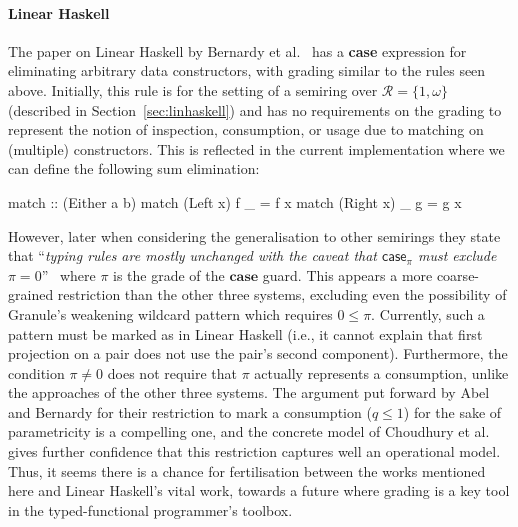  \paragraph{Linear Haskell}
 The paper on Linear Haskell by Bernardy et
 al.~\cite{linear-haskell} has a \textbf{case} expression for
 eliminating arbitrary data constructors, with grading similar
 to the rules seen above. Initially, this rule is for the setting
 of a semiring over $\mathcal{R} = \{1, \omega\}$ (described
 in Section~\ref{sec:linhaskell}) and has no requirements on the grading
 to represent the notion of inspection, consumption, or usage due to
 matching on (multiple) constructors.
 This is reflected in the current
 implementation where we can define the following sum elimination:
 \begin{haskell}
 match :: (Either a b) %
 match (Left x) f _  = f x
 match (Right x) _ g = g x
 \end{haskell}
 However, later when considering
 the generalisation to other semirings they state that
 ``\emph{typing rules are mostly unchanged with the caveat that
 $\mathsf{case}_\pi$ must exclude $\pi = 0$}''~\cite[\S{}7.2,
 p.25]{linear-haskell} where $\pi$ is the grade of the $\textbf{case}$ guard.
 This appears a more coarse-grained restriction
 than the other three systems, excluding even the possibility of
 Granule's weakening wildcard pattern which requires $0 \leq \pi$.
 Currently, such a pattern must be marked as  in Linear
 Haskell (i.e., it cannot explain that first projection on a pair
 does not use the pair's second component).
 Furthermore, the condition $\pi \neq 0$ does not require that $\pi$
 actually
 represents a consumption, unlike the approaches of the other three
 systems.
 The argument put forward by Abel and Bernardy for their restriction to
 mark a consumption ($q \leq 1$)
 for the sake of parametricity is a compelling one, and the concrete model of
 Choudhury et al. gives further confidence that this restriction captures well an
 operational model.
 Thus, it seems there is a chance for fertilisation
 between the works mentioned here and Linear Haskell's vital work, towards a
 future where grading is a key tool in the typed-functional programmer's toolbox.